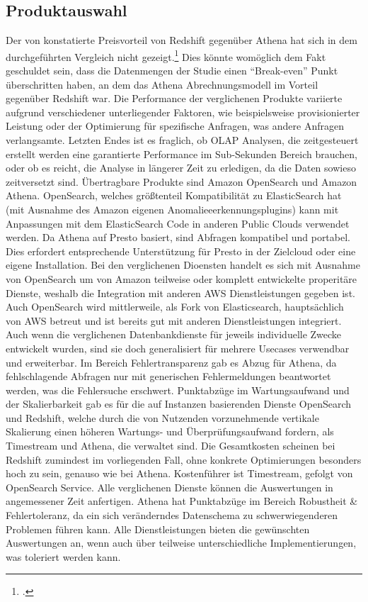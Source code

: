 \subsection{Produktauswahl}
Der von \citeauthor{Tan.2019} konstatierte Preisvorteil von Redshift gegenüber Athena hat sich in dem durchgeführten Vergleich nicht gezeigt.\footcite[Vgl.][2178\psq]{Tan.2019} Dies könnte womöglich dem Fakt geschuldet sein, dass die Datenmengen der Studie einen \enquote{Break-even} Punkt überschritten haben, an dem das Athena Abrechnungsmodell im Vorteil gegenüber Redshift war.
Die Performance der verglichenen Produkte variierte aufgrund verschiedener unterliegender Faktoren, wie beispielsweise provisionierter Leistung oder der Optimierung für spezifische Anfragen, was andere Anfragen verlangsamte. Letzten Endes ist es fraglich, ob \ac{OLAP} Analysen, die zeitgesteuert erstellt werden eine garantierte Performance im Sub-Sekunden Bereich brauchen, oder ob es reicht, die Analyse in längerer Zeit zu erledigen, da die Daten sowieso zeitversetzt sind.
Übertragbare Produkte sind Amazon OpenSearch und Amazon Athena. OpenSearch, welches größtenteil Kompatibilität zu ElasticSearch hat (mit Ausnahme des Amazon eigenen Anomalieeerkennungsplugins) kann mit Anpassungen mit dem ElasticSearch Code in anderen Public Clouds verwendet werden. Da Athena auf Presto basiert, sind Abfragen kompatibel und portabel. Dies erfordert entsprechende Unterstützung für Presto in der Zielcloud oder eine eigene Installation.
Bei den verglichenen Dioensten handelt es sich mit Ausnahme von OpenSearch um von Amazon teilweise oder komplett entwickelte properitäre Dienste, weshalb die Integration mit anderen \ac{AWS} Dienstleistungen gegeben ist. Auch OpenSearch wird mittlerweile, als Fork von Elasticsearch, hauptsächlich von \ac{AWS} betreut und ist bereits gut mit anderen Dienstleistungen integriert.
Auch wenn die verglichenen Datenbankdienste für jeweils individuelle Zwecke entwickelt wurden, sind sie doch generalisiert für mehrere Usecases verwendbar und erweiterbar.
Im Bereich Fehlertransparenz gab es Abzug für Athena, da fehlschlagende Abfragen nur mit generischen Fehlermeldungen beantwortet werden, was die Fehlersuche erschwert.
Punktabzüge im Wartungsaufwand und der Skalierbarkeit gab es für die auf Instanzen basierenden Dienste OpenSearch und Redshift, welche durch die von Nutzenden vorzunehmende vertikale Skalierung einen höheren Wartungs- und Überprüfungsaufwand fordern, als Timestream und Athena, die verwaltet sind.
Die Gesamtkosten scheinen bei Redshift zumindest im vorliegenden Fall, ohne konkrete Optimierungen besonders hoch zu sein, genauso wie bei Athena. Kostenführer ist Timestream, gefolgt von OpenSearch Service.
Alle verglichenen Dienste können die Auswertungen in angemessener Zeit anfertigen. 
Athena hat Punktabzüge im Bereich Robustheit \& Fehlertoleranz, da ein sich veränderndes Datenschema zu schwerwiegenderen Problemen führen kann.
Alle Dienstleistungen bieten die gewünschten Auswertungen an, wenn auch über teilweise unterschiedliche Implementierungen, was toleriert werden kann.




